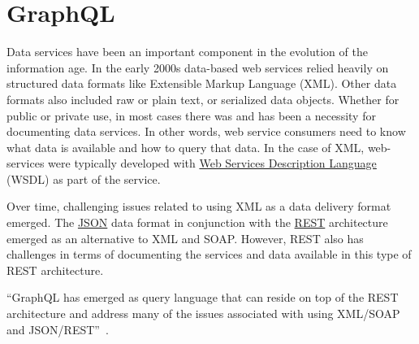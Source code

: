 \section{GraphQL}

Data services have been an important component in the evolution of the 
information age.  In the early 2000s data-based web services relied heavily on
structured data formats like Extensible Markup Language (XML).  Other data 
formats also included raw or plain text, or serialized data objects.  Whether for 
public or private use, in most cases there was and has been a necessity for 
documenting data services.  In other words, web service consumers need to know 
what data is available and how to query that data.  In the case of XML,
web-services were typically developed with \href{https://en.wikipedia.org/wiki/Web_Services_Description_Language}
{Web Services Description Language} (WSDL) as part of the service.  

Over time, challenging issues related to using XML as a data delivery format 
emerged.  The \href{https://en.wikipedia.org/wiki/JSON}{JSON} data format in 
conjunction with the \href{https://en.wikipedia.org/wiki/Representational_state_transfer}{REST} 
architecture emerged as an alternative to XML and SOAP.  However, REST also has 
challenges in terms of documenting the services and data available in this 
type of REST architecture.

``GraphQL has emerged as query language that can reside on top of the REST 
architecture and address many of the issues associated with using XML/SOAP and 
JSON/REST''~\cite{GraphQL2018}.
